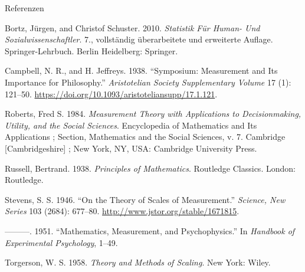 \documentclass[
  8pt,
  ignorenonframetext,
]{beamer}
\newlength{\cslhangindent}
\newlength{\cslentryspacingunit} %
\newenvironment{CSLReferences}[2] %
 {%
  \setlength{\parindent}{0pt}
  \ifodd #1
  \let\oldpar\par
  \def\par{\hangindent=\cslhangindent\oldpar}
  \fi
  \setlength{\parskip}{#2\cslentryspacingunit}
 }%
 {}
\begin{document}
\begin{frame}{Referenzen}
\protect\hypertarget{referenzen}{}
\footnotesize

\hypertarget{refs}{}
\begin{CSLReferences}{1}{0}
\leavevmode{}%
Bortz, Jürgen, and Christof Schuster. 2010. \emph{Statistik Für {Human}-
Und {Sozialwissenschaftler}}. 7., vollständig überarbeitete und
erweiterte Auflage. Springer-{Lehrbuch}. Berlin Heidelberg: Springer.

\leavevmode{}%
Campbell, N. R., and H. Jeffreys. 1938. {``Symposium: {Measurement} and
Its {Importance} for {Philosophy}.''} \emph{Aristotelian Society
Supplementary Volume} 17 (1): 121--50.
\url{https://doi.org/10.1093/aristoteliansupp/17.1.121}.

\leavevmode{}%
Roberts, Fred S. 1984. \emph{Measurement Theory with Applications to
Decisionmaking, Utility, and the Social Sciences}. Encyclopedia of
Mathematics and Its Applications ; {Section}, {Mathematics} and the
Social Sciences, v. 7. Cambridge {[}Cambridgeshire{]} ; New York, NY,
USA: Cambridge University Press.

\leavevmode{}%
Russell, Bertrand. 1938. \emph{Principles of {Mathematics}}. Routledge
Classics. London: Routledge.

\leavevmode{}%
Stevens, S. S. 1946. {``On the {Theory} of {Scales} of {Measurement}.''}
\emph{Science, New Series} 103 (2684): 677--80.
\url{http://www.jstor.org/stable/1671815}.

\leavevmode{}%
---------. 1951. {``Mathematics, Measurement, and Psychophysics.''} In
\emph{Handbook of {Experimental} {Psychology}}, 1--49.

\leavevmode{}%
Torgerson, W. S. 1958. \emph{Theory and {Methods} of {Scaling}}. New
York: Wiley.

\end{CSLReferences}
\end{frame}
\end{document}
